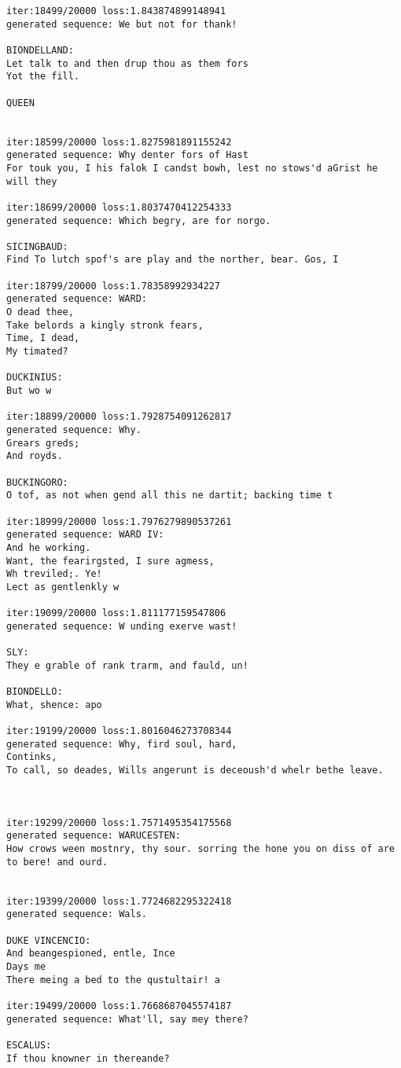 \documentclass[11pt]{article}
\begin{document}
\begin{Verbatim}[commandchars=\\\{\}]
iter:18499/20000 loss:1.843874899148941
generated sequence: We but not for thank!

BIONDELLAND:
Let talk to and then drup thou as them fors
Yot the fill.

QUEEN


iter:18599/20000 loss:1.8275981891155242
generated sequence: Why denter fors of Hast
For touk you, I his falok I candst bowh, lest no stows'd aGrist he will they 

iter:18699/20000 loss:1.8037470412254333
generated sequence: Which begry, are for norgo.

SICINGBAUD:
Find To lutch spof's are play and the norther, bear. Gos, I 

iter:18799/20000 loss:1.78358992934227
generated sequence: WARD:
O dead thee,
Take belords a kingly stronk fears,
Time, I dead,
My timated?

DUCKINIUS:
But wo w

iter:18899/20000 loss:1.7928754091262817
generated sequence: Why.
Grears greds;
And royds.

BUCKINGORO:
O tof, as not when gend all this ne dartit; backing time t

iter:18999/20000 loss:1.7976279890537261
generated sequence: WARD IV:
And he working.
Want, the fearirgsted, I sure agmess,
Wh treviled;. Ye!
Lect as gentlenkly w

iter:19099/20000 loss:1.811177159547806
generated sequence: W unding exerve wast!

SLY:
They e grable of rank trarm, and fauld, un!

BIONDELLO:
What, shence: apo

iter:19199/20000 loss:1.8016046273708344
generated sequence: Why, fird soul, hard,
Continks,
To call, so deades, Wills angerunt is deceoush'd whelr bethe leave.



iter:19299/20000 loss:1.7571495354175568
generated sequence: WARUCESTEN:
How crows ween mostnry, thy sour. sorring the hone you on diss of are to bere! and ourd.


iter:19399/20000 loss:1.7724682295322418
generated sequence: Wals.

DUKE VINCENCIO:
And beangespioned, entle, Ince
Days me
There meing a bed to the qustultair! a 

iter:19499/20000 loss:1.7668687045574187
generated sequence: What'll, say mey there?

ESCALUS:
If thou knowner in thereande?


\end{Verbatim}
\end{document}
